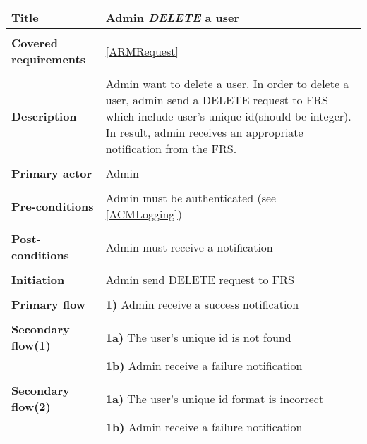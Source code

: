 \documentclass[a4paper,11pt]{article}
\begin{document}
\begin{tabular}{|p{3.5cm}|p{11.5cm}|} \hline
    \textbf{Title} &   Admin \emph{DELETE} a user

    \\ \hline \rowcolor{Gray} & \\ \hline

    \textbf{Covered requirements} &  \ref{ARMRequest}

    \\ \hline \rowcolor{Gray} & \\ \hline

    \textbf{Description} &  Admin want to delete a user. In order to delete a user, admin send a DELETE request to FRS which include user's unique id(should be integer). In result, admin receives an appropriate notification from the FRS.

    \\ \hline \rowcolor{Gray} & \\ \hline

    \textbf{Primary actor} & Admin

    \\ \hline \rowcolor{Gray} & \\ \hline

    \textbf{Pre-conditions} &   Admin must be authenticated (see \ref{ACMLogging})

    \\ \hline \rowcolor{Gray} & \\ \hline

    \textbf{Post-conditions} &   Admin must receive a notification

    \\ \hline \rowcolor{Gray} & \\ \hline

    \textbf{Initiation} & Admin send DELETE request to FRS

    \\ \hline \rowcolor{Gray} & \\ \hline

    \textbf{Primary flow} &
    \textbf{1)} Admin receive a success notification

    \\ \hline \rowcolor{Gray} & \\ \hline

    \textbf{Secondary flow(1)} &
    \textbf{1a)} The user's unique id is not found \\&
    \textbf{1b)} Admin receive a failure notification

    \\ \hline \rowcolor{Gray} & \\ \hline

    \textbf{Secondary flow(2)} &
    \textbf{1a)} The user's unique id format is incorrect \\&
    \textbf{1b)} Admin receive a failure notification

    \\ \hline
\end{tabular}
\end{document}
